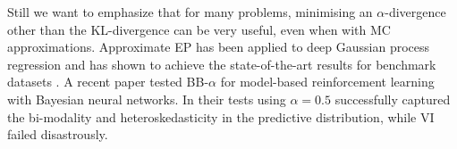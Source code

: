 Still we want to emphasize that for many problems, minimising an $\alpha$-divergence other than the KL-divergence can be very useful, even when with MC approximations. Approximate EP has been applied to deep Gaussian process regression and has shown to achieve the state-of-the-art results for benchmark datasets \cite{bui:dgp}. A recent paper \cite{depeweg:bnn_rl} tested BB-$\alpha$ for model-based reinforcement learning with Bayesian neural networks. In their tests using $\alpha = 0.5$ successfully captured the bi-modality and heteroskedasticity in the predictive distribution, while VI failed disastrously.